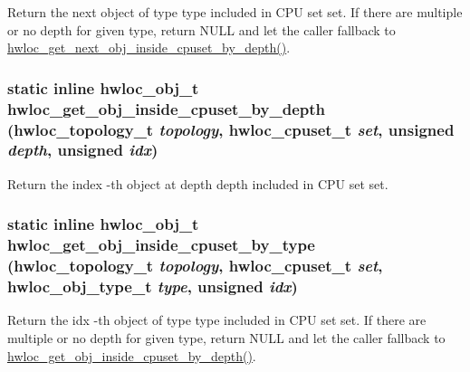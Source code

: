 Return the next object of type {\ttfamily type} included in CPU set {\ttfamily set}. If there are multiple or no depth for given type, return {\ttfamily NULL} and let the caller fallback to \hyperlink{group__hwlocality__helper__find__inside_ga9f0cdb50962d59220a557757278e1919}{hwloc\_\-get\_\-next\_\-obj\_\-inside\_\-cpuset\_\-by\_\-depth()}. \hypertarget{group__hwlocality__helper__find__inside_gad9b35f0fb89f3bb90edb11c35e7d5683}{
\subsubsection[{hwloc\_\-get\_\-obj\_\-inside\_\-cpuset\_\-by\_\-depth}]{\setlength{\rightskip}{0pt plus 5cm}static inline {\bf hwloc\_\-obj\_\-t} hwloc\_\-get\_\-obj\_\-inside\_\-cpuset\_\-by\_\-depth ({\bf hwloc\_\-topology\_\-t} {\em topology}, \/  {\bf hwloc\_\-cpuset\_\-t} {\em set}, \/  unsigned {\em depth}, \/  unsigned {\em idx})}}
\label{group__hwlocality__helper__find__inside_gad9b35f0fb89f3bb90edb11c35e7d5683}


Return the {\ttfamily index} -\/th object at depth {\ttfamily depth} included in CPU set {\ttfamily set}. \hypertarget{group__hwlocality__helper__find__inside_gafcb8f93a01a688d7772332b3ce543f6a}{
\subsubsection[{hwloc\_\-get\_\-obj\_\-inside\_\-cpuset\_\-by\_\-type}]{\setlength{\rightskip}{0pt plus 5cm}static inline {\bf hwloc\_\-obj\_\-t} hwloc\_\-get\_\-obj\_\-inside\_\-cpuset\_\-by\_\-type ({\bf hwloc\_\-topology\_\-t} {\em topology}, \/  {\bf hwloc\_\-cpuset\_\-t} {\em set}, \/  {\bf hwloc\_\-obj\_\-type\_\-t} {\em type}, \/  unsigned {\em idx})}}
\label{group__hwlocality__helper__find__inside_gafcb8f93a01a688d7772332b3ce543f6a}


Return the {\ttfamily idx} -\/th object of type {\ttfamily type} included in CPU set {\ttfamily set}. If there are multiple or no depth for given type, return {\ttfamily NULL} and let the caller fallback to \hyperlink{group__hwlocality__helper__find__inside_gad9b35f0fb89f3bb90edb11c35e7d5683}{hwloc\_\-get\_\-obj\_\-inside\_\-cpuset\_\-by\_\-depth()}. 
